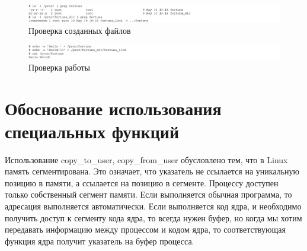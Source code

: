 \begin{figure}[H]
    \includegraphics[scale=0.5]{images/procfiles.png}
    \caption{Проверка созданных файлов}\label{img:procfiles}
\end{figure}

\begin{figure}[H]
    \includegraphics[scale=0.5]{images/showcase.png}
    \caption{Проверка работы}\label{img:showcase}
\end{figure}

\section{Обоснование использования\\специальных функций}
Использование copy\_to\_user, copy\_from\_user обусловлено тем, что в Linux память сегментирована. Это означает, что указатель не ссылается на уникальную позицию в памяти, а ссылается на позицию в сегменте. Процессу доступен только собственный сегмент памяти. Если выполняется обычная программа, то адресация выполняется автоматически. Если выполняется код ядра, и необходимо получить доступ к сегменту кода ядра, то всегда нужен буфер, но когда мы хотим передавать информацию между процессом и кодом ядра, то соответствующая функция ядра получит указатель на буфер процесса.

